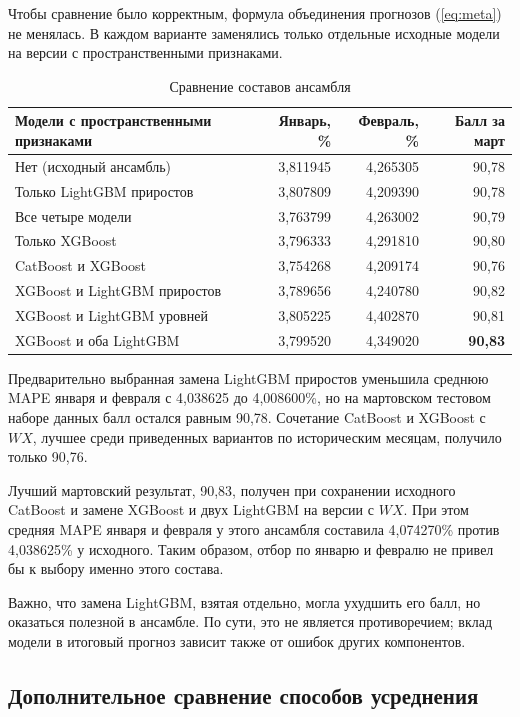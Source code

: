 \documentclass[12pt, a4paper]{article}
\newcommand{\tablesourcetext}[1]{\par\vspace{1mm}{\footnotesize Источник: #1.}}
\begin{document}
Чтобы сравнение было корректным, формула объединения прогнозов (\ref{eq:meta}) не менялась.
В каждом варианте заменялись только отдельные исходные модели на версии с пространственными признаками.

\begin{table}[H]
\centering
\footnotesize
\setlength{\tabcolsep}{4pt}
\caption{Сравнение составов ансамбля}
\begin{tabularx}{\textwidth}{Xrrr}\toprule
Модели с пространственными признаками & Январь, \% & Февраль, \% & Балл за март\\\midrule
Нет (исходный ансамбль) & 3,811945 & 4,265305 & 90,78\\
Только LightGBM приростов & 3,807809 & 4,209390 & 90,78\\
Все четыре модели & 3,763799 & 4,263002 & 90,79\\
Только XGBoost & 3,796333 & 4,291810 & 90,80\\
CatBoost и XGBoost & 3,754268 & 4,209174 & 90,76\\
XGBoost и LightGBM приростов & 3,789656 & 4,240780 & 90,82\\
XGBoost и LightGBM уровней & 3,805225 & 4,402870 & 90,81\\
XGBoost и оба LightGBM & 3,799520 & 4,349020 & \textbf{90,83}\\\bottomrule
\end{tabularx}
\tablesourcetext{расчеты авторов по данным X5 Group и GeoNames}
\end{table}

Предварительно выбранная замена LightGBM приростов уменьшила среднюю MAPE января и февраля с 4,038625 до 4,008600\%,
но на мартовском тестовом наборе данных балл остался равным 90,78. Сочетание CatBoost и XGBoost с $WX$, лучшее среди приведенных вариантов
по историческим месяцам, получило только 90,76.

Лучший мартовский результат, 90,83, получен при сохранении исходного CatBoost и замене XGBoost и двух LightGBM на версии с $WX$.
При этом средняя MAPE января и февраля у этого ансамбля составила 4,074270\% против 4,038625\% у исходного.
Таким образом, отбор по январю и февралю не привел бы к выбору именно этого состава.

Важно, что замена LightGBM, взятая отдельно, могла ухудшить его балл, но оказаться полезной в ансамбле.
По сути, это не является противоречием; вклад модели в итоговый прогноз зависит также от ошибок других компонентов.

\subsection*{Дополнительное сравнение способов усреднения}
\end{document}
